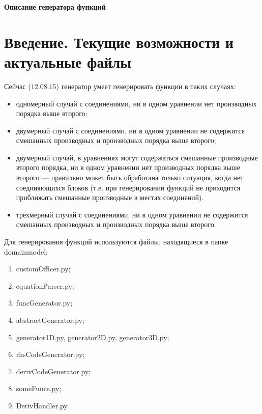 \documentclass[a4paper]{article}
\begin{document}
\begin{center}
{\Huge \bf Описание генератора функций}
\end{center}

\tableofcontents
\newpage

\large
\section*{\LARGE Введение. Текущие возможности и актуальные файлы}
Сейчас ($12.08.15$)  генератор умеет генерировать функции в таких случаях:
\begin{itemize}
\item одномерный случай с соединениями, ни в одном уравнении нет про\-из\-вод\-ных порядка выше второго;
\item двумерный случай с соединениями, ни в одном уравнении не со\-дер\-жит\-ся смешанных производных и производных порядка выше второго;
\item двумерный случай, в уравнениях могут содержаться смешанные про\-из\-вод\-ные второго порядка, ни в одном уравнении нет производных порядка выше второго --- правильно может быть обработана только ситуация, когда нет соединяющихся блоков (т.е. при генерировании функций не приходится приближать смешанные производные в мес\-тах соединений).
\item трехмерный случай с соединениями,  ни в одном уравнении не со\-дер\-жит\-ся смешанных производных и производных порядка выше второго.
\end{itemize}

Для генерирования функций используются файлы, находящиеся в пап\-ке domainmodel:
\begin{enumerate}
\item  customOfficer.py; \label{i1}
\item equationParser.py; \label{i2}
\item funcGenerator.py; \label{i3}
\item abstractGenerator.py; \label{i9}
\item generator1D.py, generator2D.py, generator3D.py; \label{i8}
\item  rhsCodeGenerator.py; \label{i4}
\item derivCodeGenerator.py; \label{i5}
\item someFuncs.py; \label{i6}
\item DerivHandler.py. \label{i7}
\end{enumerate}
\end{document}
